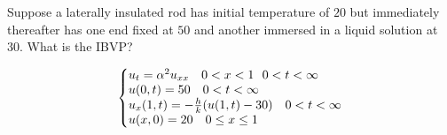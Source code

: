 \documentclass{article}
\begin{document}
\begin{exercise}
Suppose a laterally insulated rod has initial temperature of $20$ but immediately thereafter has one end fixed at $50$ and another immersed in a liquid solution at $30$. What is the IBVP?
\end{exercise}

\begin{solution}
$$\left\{\begin{array}{@{}l@{}} u_t = \alpha^2u_{xx} \ \ \ 0<x<1 \ \ 0<t<\infty \\u(0,t) = 5 0 \ \ \ 0<t<\infty \\ u_x(1,t) = -\frac{h}{k}(u(1,t) - 30) \ \ \ 0<t<\infty \\ u(x,0) = 20 \ \ \ 0\leq x \leq 1 \end{array}\right.$$
\end{solution}
\end{document}
